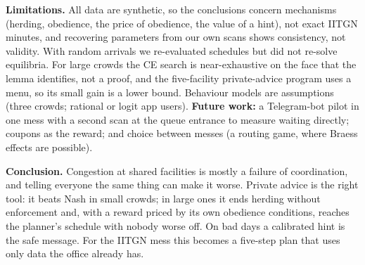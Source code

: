 \documentclass{article}
\begin{document}
\textbf{Limitations.} All data are synthetic, so the conclusions concern mechanisms (herding, obedience, the price
of obedience, the value of a hint), not exact IITGN minutes, and recovering parameters from our own scans shows
consistency, not validity. With random arrivals we re-evaluated schedules but did not re-solve equilibria. For large
crowds the CE search is near-exhaustive on the face that the lemma identifies, not a proof, and the five-facility
private-advice program uses a menu, so its small gain is a lower bound. Behaviour models are assumptions (three
crowds; rational or logit app users). \textbf{Future work:} a Telegram-bot pilot in one mess with a second scan at
the queue entrance to measure waiting directly; coupons as the reward; and choice between messes (a routing game,
where Braess effects are possible).

\textbf{Conclusion.} Congestion at shared facilities is mostly a failure of coordination, and telling everyone the
same thing can make it worse. Private advice is the right tool: it beats Nash in small crowds; in large ones it ends
herding without enforcement and, with a reward priced by its own obedience conditions, reaches the planner's schedule
with nobody worse off. On bad days a calibrated hint is the safe message. For the IITGN mess this becomes a five-step
plan that uses only data the office already has.

\end{document}
